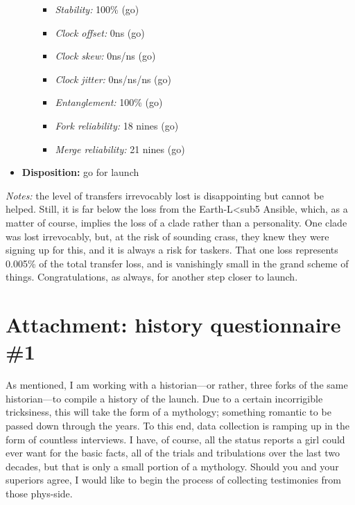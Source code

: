 \begin{itemize}
\begin{itemize}
    \begin{itemize}
    \tightlist
    \item
      \emph{Stability:} 100\% (go)
    \item
      \emph{Clock offset:} 0ns (go)
    \item
      \emph{Clock skew:} 0ns/ns (go)
    \item
      \emph{Clock jitter:} 0ns/ns/ns (go)
    \item
      \emph{Entanglement:} 100\% (go)
    \item
      \emph{Fork reliability:} 18 nines (go)
    \item
      \emph{Merge reliability:} 21 nines (go)
    \end{itemize}
  \end{itemize}
\item
  \textbf{Disposition:} go for launch
\end{itemize}

\emph{Notes:} the level of transfers irrevocably lost is disappointing but cannot be helped. Still, it is far below the loss from the Earth-L\textless sub5 Ansible, which, as a matter of course, implies the loss of a clade rather than a personality. One clade was lost irrevocably, but, at the risk of sounding crass, they knew they were signing up for this, and it is always a risk for taskers. That one loss represents 0.005\% of the total transfer loss, and is vanishingly small in the grand scheme of things. Congratulations, as always, for another step closer to launch.

\hypertarget{attachment-history-questionnaire-1}{%
\section{Attachment: history questionnaire \#1}\label{attachment-history-questionnaire-1}}

As mentioned, I am working with a historian---or rather, three forks of the same historian---to compile a history of the launch. Due to a certain incorrigible tricksiness, this will take the form of a mythology; something romantic to be passed down through the years. To this end, data collection is ramping up in the form of countless interviews. I have, of course, all the status reports a girl could ever want for the basic facts, all of the trials and tribulations over the last two decades, but that is only a small portion of a mythology. Should you and your superiors agree, I would like to begin the process of collecting testimonies from those phys-side.


